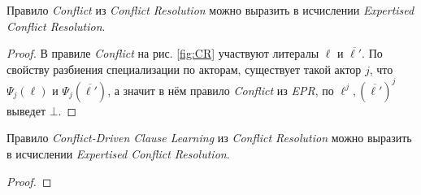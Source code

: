 \begin{lemma}
\label{lem:confl}
Правило \emph{Conflict} из \emph{Conflict Resolution} можно выразить в исчислении \emph{Expertised Conflict Resolution}.
\end{lemma}
\begin{proof}
В правиле \emph{Conflict} на рис. \ref{fig:CR} участвуют литералы $\ell$ и $\overline{\ell'}$. По свойству разбиения специализации по акторам, существует такой актор $j$, что $\Psi_j(\ell)$ и $\Psi_j(\overline{\ell'})$, а значит в нём правило \emph{Conflict} из \emph{EPR}, по $\ell^j, (\overline{\ell'})^j$ выведет $\bot$.
\end{proof}

\begin{lemma}
\label{lem:cdcl}
Правило \emph{Conflict-Driven Clause Learning} из \emph{Conflict Resolution} можно выразить в исчислении \emph{Expertised Conflict Resolution}.
\end{lemma}
\begin{proof}

\end{proof}

